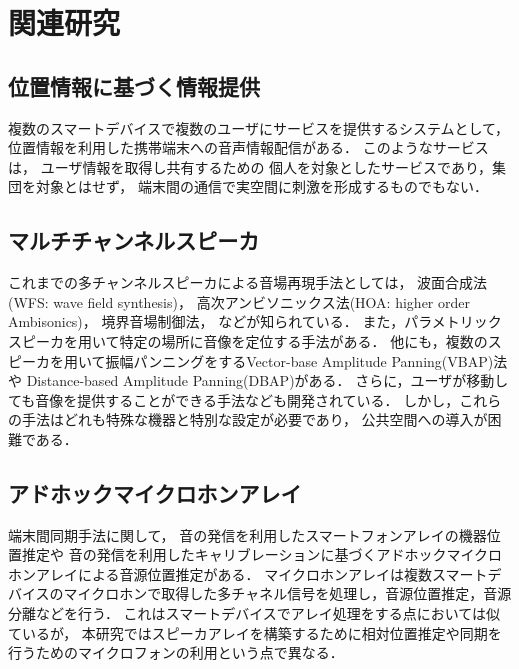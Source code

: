 \chapter{関連研究}

\section{位置情報に基づく情報提供}

複数のスマートデバイスで複数のユーザにサービスを提供するシステムとして，
位置情報を利用した携帯端末への音声情報配信\cite{kawagoe14}がある．
このようなサービスは，
ユーザ情報を取得し共有するための
個人を対象としたサービスであり，集団を対象とはせず，
端末間の通信で実空間に刺激を形成するものでもない．


\section{マルチチャンネルスピーカ}

これまでの多チャンネルスピーカによる音場再現手法としては，
波面合成法(WFS: wave field synthesis)\cite{wfs, 木村敏幸}，
高次アンビソニックス法(HOA: higher order Ambisonics)\cite{hoa, 小山翔一}，
境界音場制御法\cite{sfc, 伊勢史郎, 岡田耕介}，
などが知られている\cite{鈴木陽一, 濱崎公男, 尾本章}．
また，パラメトリックスピーカを用いて特定の場所に音像を定位する手法\cite{paramsp}がある．
他にも，複数のスピーカを用いて振幅パンニングをするVector-base Amplitude Panning(VBAP)法\cite{PULKKI}や
Distance-based Amplitude Panning(DBAP)\cite{dbap}がある．
さらに，ユーザが移動しても音像を提供することができる手法\cite{湯山雄太}なども開発されている．
しかし，これらの手法はどれも特殊な機器と特別な設定が必要であり，
公共空間への導入が困難である．



\section{アドホックマイクロホンアレイ}

端末間同期手法に関して，
音の発信を利用したスマートフォンアレイの機器位置推定\cite{shibata13}や
音の発信を利用したキャリブレーションに基づくアドホックマイクロホンアレイによる音源位置推定\cite{shibata14}がある．
マイクロホンアレイは複数スマートデバイスのマイクロホンで取得した多チャネル信号を処理し，音源位置推定，音源分離などを行う\cite{小野順貴14-1, 小野順貴14-2}．
これはスマートデバイスでアレイ処理をする点においては似ているが，
本研究ではスピーカアレイを構築するために相対位置推定や同期を行うためのマイクロフォンの利用という点で異なる．


